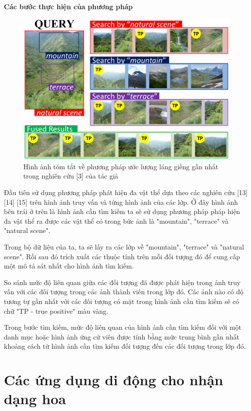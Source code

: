 \documentclass[12pt]{report}
\begin{document}
		\textbf{Các bước thực hiện của phương pháp}
		\begin{figure}[h]
			\centering
			\includegraphics[scale=0.4]{one}
			\caption{Hình ảnh tóm tắt về phương pháp ước lượng láng giềng gần nhất trong nghiên cứu [3] của tác giả}
			\label{fig:one}
		\end{figure}
																		
		Đầu tiên sử dụng phương pháp phát hiện đa vật thể dựa theo các nghiên cứu [13] [14] [15] trên hình ảnh truy vấn và từng hình ảnh của các lớp. Ở đây hình ảnh bên trái ở trên là hình ảnh cần tìm kiếm ta sẽ sử dụng phương pháp pháp hiện đa vật thể ra được các vật thể có trong bức ảnh là "mountain", "terrace" và "natural scene".
																		
		Trong bộ dữ liệu của ta, ta sẽ lấy ra các lớp về "mountain", "terrace" và "natural scene". Rồi sau đó trích xuất các thuộc tính trên mỗi đối tượng đó để cung cấp một mô tả sát nhất cho hình ảnh tìm kiếm. 
																		
		So sánh mức độ liên quan giữa các đối tượng đã được phát hiện trong ảnh truy vấn với các đối tượng trong các ảnh thành viên trong lớp đó. Các ảnh nào có độ tương tự gần nhất với các đối tượng có mặt trong hình ảnh cần tìm kiếm sẽ có chữ "TP - true positive" màu vàng.
																		
		Trong bước tìm kiếm, mức độ liên quan của hình ảnh cần tìm kiếm đối với một danh mục hoặc hình ảnh ứng cử viên được tính bằng mức trung bình gần nhất khoảng cách từ hình ảnh cần tìm kiếm đối tượng đến các đối tượng trong lớp đó.
																		
		\section{Các ứng dụng di động cho nhận dạng hoa}
																
\end{document}
